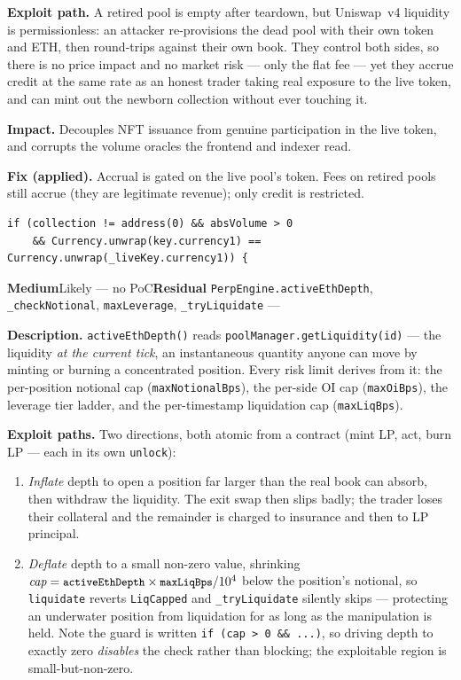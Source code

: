 \documentclass[10pt,a4paper]{article}
\newcommand{\sev}[2]{\textcolor{#1}{\textbf{#2}}}
\newcommand{\SevMed}{\sev{med}{Medium}}
\newcommand{\Residual}{\textcolor{med}{\textbf{Residual}}}
\newcommand{\code}[1]{\texttt{\small #1}}
\begin{document}
\textbf{Exploit path.} A retired pool is empty after teardown, but Uniswap~v4 liquidity is
permissionless: an attacker re-provisions the dead pool with their own token and ETH, then
round-trips against their own book. They control both sides, so there is no price impact
and no market risk --- only the flat fee --- yet they accrue credit at the same rate as an
honest trader taking real exposure to the live token, and can mint out the newborn
collection without ever touching it.

\textbf{Impact.} Decouples NFT issuance from genuine participation in the live token, and
corrupts the volume oracles the frontend and indexer read.

\textbf{Fix (applied).} Accrual is gated on the live pool's token. Fees on retired pools
still accrue (they are legitimate revenue); only credit is restricted.
\begin{lstlisting}
if (collection != address(0) && absVolume > 0
    && Currency.unwrap(key.currency1) == Currency.unwrap(_liveKey.currency1)) {
\end{lstlisting}

{\SevMed}{Likely --- no PoC}{\Residual}
{\code{PerpEngine.activeEthDepth}, \code{\_checkNotional}, \code{maxLeverage}, \code{\_tryLiquidate}}
{---}

\textbf{Description.} \code{activeEthDepth()} reads \code{poolManager.getLiquidity(id)} ---
the liquidity \emph{at the current tick}, an instantaneous quantity anyone can move by
minting or burning a concentrated position. Every risk limit derives from it: the
per-position notional cap (\code{maxNotionalBps}), the per-side OI cap
(\code{maxOiBps}), the leverage tier ladder, and the per-timestamp liquidation cap
(\code{maxLiqBps}).

\textbf{Exploit paths.} Two directions, both atomic from a contract (mint LP, act, burn LP
--- each in its own \code{unlock}):
\begin{enumerate}[leftmargin=1.5em]
\item \emph{Inflate} depth to open a position far larger than the real book can absorb,
then withdraw the liquidity. The exit swap then slips badly; the trader loses their
collateral and the remainder is charged to insurance and then to LP principal.
\item \emph{Deflate} depth to a small non-zero value, shrinking
$\textit{cap} = \code{activeEthDepth} \times \code{maxLiqBps}/10^4$ below the position's
notional, so \code{liquidate} reverts \code{LiqCapped} and \code{\_tryLiquidate} silently
skips --- protecting an underwater position from liquidation for as long as the
manipulation is held. Note the guard is written \code{if (cap > 0 \&\& ...)}, so driving
depth to exactly zero \emph{disables} the check rather than blocking; the exploitable
region is small-but-non-zero.
\end{enumerate}
\end{document}
